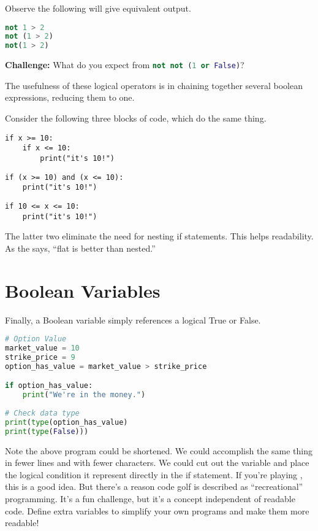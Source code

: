 \noindent Observe the following will give equivalent output.

\begin{lstlisting}[language = Python]
not 1 > 2
not (1 > 2)
not(1 > 2) \end{lstlisting}


\smallskip

\noindent \textbf{Challenge: } What do you expect from \lstinline[language = Python]{not not (1 or False)}?
        
The usefulness of these logical operators is in chaining together several boolean expressions, reducing them to one. 

Consider the following three blocks of code, which do the same thing. 

\begin{lstlisting}
if x >= 10:
    if x <= 10:
        print("it's 10!")
\end{lstlisting}

\begin{lstlisting}
if (x >= 10) and (x <= 10):
    print("it's 10!")
\end{lstlisting}

\begin{lstlisting}
if 10 <= x <= 10:
    print("it's 10!")
\end{lstlisting}

The latter two eliminate the need for nesting if statements. This helps readability. As the  says, ``flat is better than nested.''


\section{Boolean Variables}

Finally, a Boolean variable simply references a logical True or False.

\begin{lstlisting}[language = Python]
# Option Value
market_value = 10
strike_price = 9
option_has_value = market_value > strike_price

if option_has_value:
    print("We're in the money.")
    
# Check data type
print(type(option_has_value)
print(type(False))) \end{lstlisting}


Note the above program could be shortened. We could accomplish the same thing in fewer lines and with fewer characters. We could cut out the variable  and place the logical condition it represent directly in the if statement. If you're playing , this is a good idea. But there's a reason code golf is described as ``recreational'' programming. It's a fun challenge, but it's a concept independent of readable code. Define extra variables to simplify your own programs and make them more readable!

